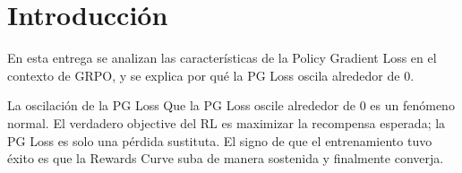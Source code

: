 \section{Introducción}
En esta entrega se analizan las características de la Policy Gradient Loss en el contexto de GRPO, y se explica por qué la PG Loss oscila alrededor de 0.

\begin{importantbox}{La oscilación de la PG Loss}
Que la PG Loss oscile alrededor de 0 es un fenómeno normal. El verdadero objective del RL es maximizar la recompensa esperada; la PG Loss es solo una pérdida sustituta. El signo de que el entrenamiento tuvo éxito es que la Rewards Curve suba de manera sostenida y finalmente converja.
\end{importantbox}

